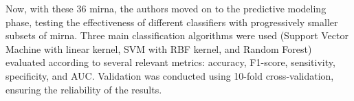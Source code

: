 Now, with these 36 \gls{mirna}, the authors moved on to the predictive modeling
phase, testing the effectiveness of different classifiers with progressively
smaller subsets of \gls{mirna}. Three main classification algorithms were used
(Support Vector Machine with linear kernel, SVM with RBF kernel, and Random
Forest) evaluated according to several relevant metrics: accuracy, F1-score,
sensitivity, specificity, and AUC. Validation was conducted using 10-fold
cross-validation, ensuring the reliability of the results.


